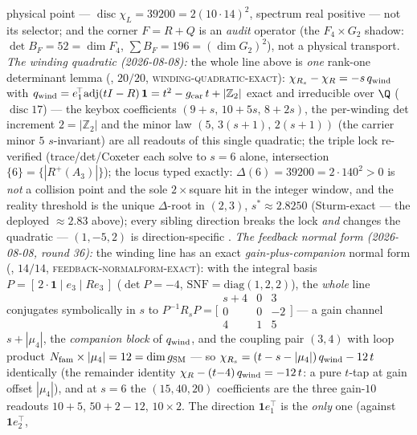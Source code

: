 \documentclass[11pt,a4paper]{article}
\newcommand{\gcar}{g_{\mathrm{car}}}
\newcommand{\Nfam}{N_{\mathrm{fam}}}
\newcommand{\Z}{\mathbb{Z}}
\theoremstyle{definition}
\begin{document}
\begin{winbox}
physical point --- $\operatorname{disc}\chi_L=39200=2(10\cdot14)^2$, spectrum real positive --- not its
selector; and the corner $F=R{+}Q$ is an \emph{audit} operator (the $F_4{\times}G_2$ shadow:
$\det B_F=52=\dim F_4$, $\sum B_F=196=(\dim G_2)^2$), not a physical transport.
\emph{The winding quadratic (2026-08-08):} the whole line above is \emph{one} rank-one determinant lemma
(, $20/20$, \textsc{winding-quadratic-exact}):
$\chi_{R_s} - \chi_R = -s\,q_{\rm wind}$ with
$q_{\rm wind} = e_1^{\!\top}\mathrm{adj}(tI - R)\,\mathbf 1 = t^2 - \gcar\,t + |\Z_2|$
exact and irreducible over $\Q$ ($\operatorname{disc} 17$) --- the keybox coefficients
$(9{+}s,\, 10{+}5s,\, 8{+}2s)$, the per-winding det increment $2 = |\Z_2|$ and the minor law
$(5,\, 3(s{+}1),\, 2(s{+}1))$ (the carrier minor $5$ $s$-invariant) are all readouts of this single
quadratic; the triple lock re-verified (trace/det/Coxeter each solve to $s = 6$ alone, intersection
$\{6\} = \{|R^+(A_3)|\}$); the locus typed exactly: $\Delta(6) = 39200 = 2\cdot140^2 > 0$ is \emph{not} a
collision point and the sole $2{\times}$square hit in the integer window, and the reality threshold is
the unique $\Delta$-root in $(2,3)$, $s^* \approx 2.8250$ (Sturm-exact --- the deployed $\approx 2.83$
above); every sibling direction breaks the lock \emph{and} changes the quadratic --- $(1, -5, 2)$ is
direction-specific \mE.
\emph{The feedback normal form (2026-08-08, round 36):} the winding line has an exact
\emph{gain-plus-companion} normal form (, $14/14$,
\textsc{feedback-normalform-exact}): with the integral basis $P = [\,2\cdot\mathbf 1 \mid e_3 \mid
R e_3\,]$ ($\det P = -4$, $\mathrm{SNF} = \mathrm{diag}(1,2,2)$), the \emph{whole} line conjugates
symbolically in $s$ to $P^{-1} R_s P = \bigl[\begin{smallmatrix} s+4 & 0 & 3\\ 0 & 0 & -2\\ 4 & 1 & 5
\end{smallmatrix}\bigr]$ --- a gain channel $s + |\mu_4|$, the \emph{companion block} of $q_{\rm wind}$,
and the coupling pair $(3,4)$ with loop product $\Nfam \times |\mu_4| = 12 = \dim g_{\rm SM}$ --- so
$\chi_{R_s} = (t - s - |\mu_4|)\,q_{\rm wind} - 12\,t$ identically (the remainder identity
$\chi_R - (t{-}4)\,q_{\rm wind} = -12\,t$: a pure $t$-tap at gain offset $|\mu_4|$), and at $s = 6$ the
$(15, 40, 20)$ coefficients are the three gain-$10$ readouts $10{+}5$, $50{+}2{-}12$, $10\times2$.  The
direction $\mathbf 1 e_1^{\!\top}$ is the \emph{only} one (against $\mathbf 1 e_2^{\!\top}$,

\end{winbox}
\end{document}
